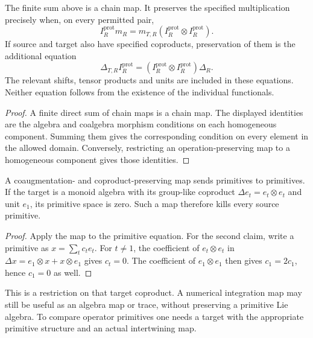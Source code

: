 \begin{proposition}
\label{prop:protected-integration-definition}
\label{prop:protected-integration-product-compatibility}
\label{prop:protected-integration-coproduct-compatibility}
The finite sum above is a chain map. It preserves the specified
multiplication precisely when, on every permitted pair,
\[
 I_R^{\mathrm{prot}}m_R
 =m_{T,R}(I_R^{\mathrm{prot}}\otimes I_R^{\mathrm{prot}}).
\]
If source and target also have specified coproducts, preservation
of them is the additional equation
\[
 \Delta_{T,R}I_R^{\mathrm{prot}}
 =(I_R^{\mathrm{prot}}\otimes I_R^{\mathrm{prot}})\Delta_R.
\]
The relevant shifts, tensor products and units are included in
these equations. Neither equation follows from the existence of
the individual functionals.
\end{proposition}

\begin{proof}
A finite direct sum of chain maps is a chain map. The displayed
identities are the algebra and coalgebra morphism conditions on
each homogeneous component. Summing them gives the corresponding
condition on every element in the allowed domain. Conversely,
restricting an operation-preserving map to a homogeneous component
gives those identities.
\end{proof}

\begin{proposition}
\label{prop:protected-integration-primitive-compatibility}
A coaugmentation- and coproduct-preserving map sends primitives
to primitives. If the target is a monoid algebra with its
group-like coproduct
$\Delta e_t=e_t\otimes e_t$ and unit $e_1$, its primitive
space is zero. Such a map therefore kills every source primitive.
\end{proposition}

\begin{proof}
Apply the map to the primitive equation. For the second claim,
write a primitive as $x=\sum_t c_te_t$. For $t\ne1$, the
coefficient of $e_t\otimes e_t$ in
$\Delta x=e_1\otimes x+x\otimes e_1$ gives $c_t=0$.
The coefficient of $e_1\otimes e_1$ then gives $c_1=2c_1$,
hence $c_1=0$ as well.
\end{proof}

This is a restriction on that target coproduct. A numerical
integration map may still be useful as an algebra map or trace,
without preserving a primitive Lie algebra. To compare operator
primitives one needs a target with the appropriate primitive
structure and an actual intertwining map.

